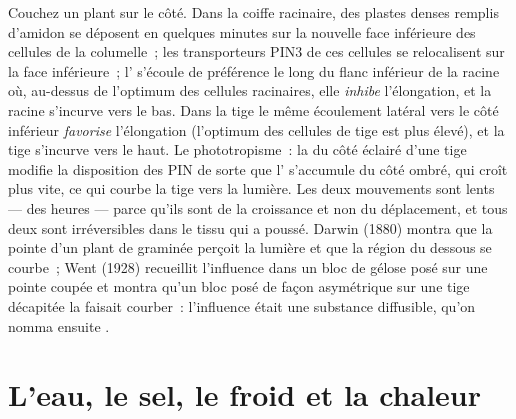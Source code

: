 \begin{example}\label{ex:b3:plant-molecular-physiology:tropism}
Couchez un plant sur le côté. Dans la coiffe racinaire, des plastes
denses remplis d'amidon se déposent en quelques minutes sur la nouvelle
face inférieure des cellules de la columelle~; les transporteurs PIN3 de
ces cellules se relocalisent sur la face inférieure~; l' s'écoule
de préférence le long du flanc inférieur de la racine où, au-dessus de
l'optimum des cellules racinaires, elle \emph{inhibe} l'élongation, et
la racine s'incurve vers le bas. Dans la tige le même écoulement latéral
vers le côté inférieur \emph{favorise} l'élongation (l'optimum des
cellules de tige est plus élevé), et la tige s'incurve vers le haut. Le
phototropisme~: la  du côté éclairé d'une tige modifie la
disposition des PIN de sorte que l' s'accumule du côté ombré, qui
croît plus vite, ce qui courbe la tige vers la lumière. Les deux
mouvements sont lents --- des heures --- parce qu'ils sont de la
croissance et non du déplacement, et tous deux sont irréversibles dans
le tissu qui a poussé. Darwin (1880) montra que la pointe d'un plant de
graminée perçoit la lumière et que la région du dessous se courbe~; Went
(1928) recueillit l'influence dans un bloc de gélose posé sur une pointe
coupée et montra qu'un bloc posé de façon asymétrique sur une tige
décapitée la faisait courber~: l'influence était une substance
diffusible, qu'on nomma ensuite .
\end{example}

\section{L'eau, le sel, le froid et la chaleur}

